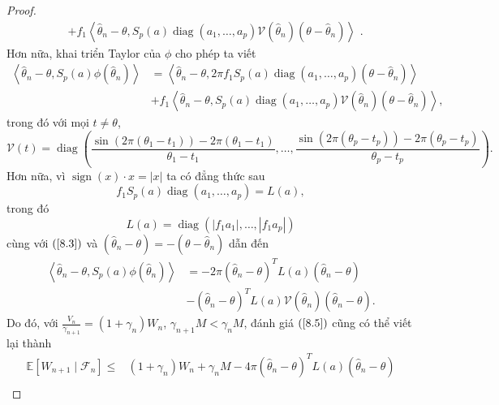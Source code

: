 \begin{proof}
$$\begin{aligned}
    & +f_{1}\left\langle\widehat{\theta}_{n}-\theta, S_{p}(a) \operatorname{diag}\left(a_{1}, \ldots, a_{p}\right) \mathcal{V}\left(\widehat{\theta}_{n}\right)\left(\theta-\widehat{\theta}_{n}\right)\right\rangle \text{ .}
\end{aligned}
$$
Hơn nữa, khai triển Taylor của $\phi$ cho phép ta viết
\begin{align}
\left\langle\widehat{\theta}_{n}-\theta, S_{p}(a) \phi\left(\widehat{\theta}_{n}\right)\right\rangle& =\left\langle\widehat{\theta}_{n}-\theta, 2 \pi f_{1} S_{p}(a) \operatorname{diag}\left(a_{1}, \ldots, a_{p}\right)\left(\theta-\widehat{\theta}_{n}\right)\right\rangle\\
& +f_{1}\left\langle\widehat{\theta}_{n}-\theta, S_{p}(a) \operatorname{diag}\left(a_{1}, \ldots, a_{p}\right) \mathcal{V}\left(\widehat{\theta}_{n}\right)\left(\theta-\widehat{\theta}_{n}\right)\right\rangle,
\label{8.6}
\end{align}
trong đó với mọi $t \neq \theta$,
$$
\mathcal{V}(t)=\operatorname{diag}\left(\frac{\sin \left(2 \pi\left(\theta_{1}-t_{1}\right)\right)-2 \pi\left(\theta_{1}-t_{1}\right)}{\theta_{1}-t_{1}}, \ldots, \frac{\sin \left(2 \pi\left(\theta_{p}-t_{p}\right)\right)-2 \pi\left(\theta_{p}-t_{p}\right)}{\theta_{p}-t_{p}}\right).
$$
Hơn nữa, vì $\operatorname{sign}\left(x\right)\cdot x = |x|$ ta có đẳng thức sau
$$
f_{1} S_{p}(a) \operatorname{diag}\left(a_{1}, \ldots, a_{p}\right)=L(a),
$$
trong đó
$$
L(a)=\operatorname{diag}\left(\left|f_{1} a_{1}\right|, \ldots,\left|f_{1} a_{p}\right|\right)
$$
cùng với $\left(\text{\ref{8.3}}\right)$ và $\left(\widehat{\theta}_{n}-\theta\right) = - \left(\theta - \widehat{\theta}_{n}\right)$ dẫn đến
$$
\begin{aligned}
\left\langle\widehat{\theta}_{n}-\theta, S_{p}(a) \phi\left(\widehat{\theta}_{n}\right)\right\rangle& =-2 \pi\left(\widehat{\theta}_{n}-\theta\right)^{T} L(a)\left(\widehat{\theta}_{n}-\theta\right) \\
& -\left(\widehat{\theta}_{n}-\theta\right)^{T} L(a) \mathcal{V}\left(\widehat{\theta}_{n}\right)\left(\widehat{\theta}_{n}-\theta\right).
\end{aligned}
$$
Do đó, với $\frac{V_{n}}{\gamma_{n+1}} = \left(1+\gamma_{n}\right) W_{n}$, $\gamma_{n+1} M < \gamma_{n} M$, đánh giá $\left(\text{\ref{8.5}}\right)$ cũng có thể viết lại thành
\begin{align}
\mathbb{E}\left[W_{n+1} \mid \mathcal{F}_{n}\right] \leq & \left(1+\gamma_{n}\right) W_{n}+\gamma_{n} M-4 \pi\left(\widehat{\theta}_{n}-\theta\right)^{T} L(a)\left(\widehat{\theta}_{n}-\theta\right) \\

\end{align}
\end{proof}
